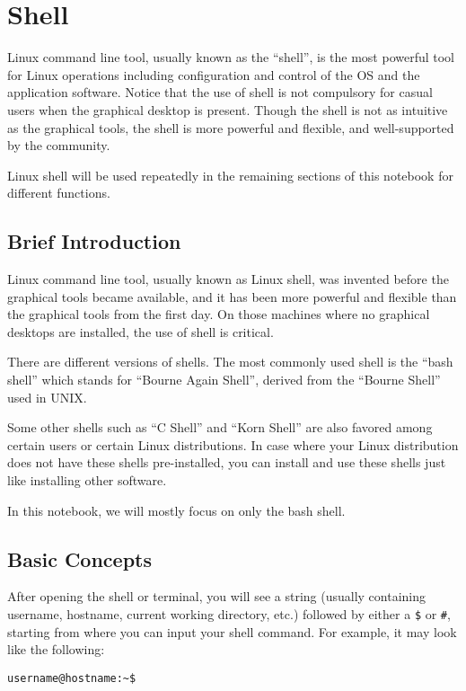 \chapter{Shell}

Linux command line tool, usually known as the ``shell'', is the most powerful tool for Linux operations including configuration and control of the OS and the application software. Notice that the use of shell is not compulsory for casual users when the graphical desktop is present. Though the shell is not as intuitive as the graphical tools, the shell is more powerful and flexible, and well-supported by the community. 

Linux shell will be used repeatedly in the remaining sections of this notebook for different functions.

\section{Brief Introduction}

Linux command line tool, usually known as Linux shell, was invented before the graphical tools became available, and it has been more powerful and flexible than the graphical tools from the first day. On those machines where no graphical desktops are installed, the use of shell is critical.

There are different versions of shells. The most commonly used shell is the ``bash shell'' which stands for ``Bourne Again Shell'', derived from the ``Bourne Shell'' used in UNIX.

Some other shells such as ``C Shell'' and ``Korn Shell'' are also favored among certain users or certain Linux distributions. In case where your Linux distribution does not have these shells pre-installed, you can install and use these shells just like installing other software.

In this notebook, we will mostly focus on only the bash shell.

\section{Basic Concepts}

After opening the shell or terminal, you will see a string (usually containing username, hostname, current working directory, etc.) followed by either a \verb|$| or \verb|#|, starting from where you can input your shell command. For example, it may look like the following:
\begin{verbatim}
username@hostname:~$
\end{verbatim}

